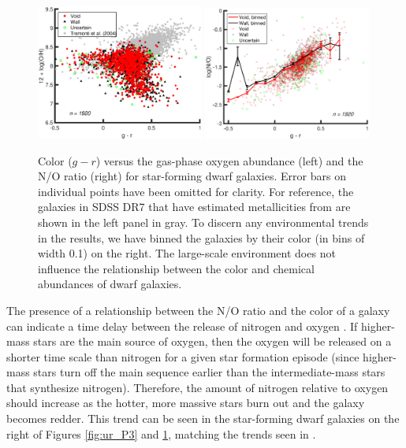 \begin{figure}
    \centering
    \includegraphics[width=0.49\textwidth]{Images/Paper3/gr_OH_1sig_I06relations_dwarf+T04_SF_t3_dust}
    \includegraphics[width=0.49\textwidth]{Images/Paper3/gr_NO_1sig_I06relations_dwarf_SF_t3_dust_scatterGRbin}
    \caption[$g-r$ versus O/H and N/O for star-forming dwarf galaxies]{Color 
    ($g-r$) versus the gas-phase oxygen abundance (left) and the N/O ratio 
    (right) for star-forming dwarf galaxies.  Error bars on individual points 
    have been omitted for clarity.  For reference, the galaxies in SDSS DR7 that 
    have estimated metallicities from \cite{Tremonti04} are shown in the left 
    panel in gray.  To discern any environmental trends in the results, we have 
    binned the galaxies by their color (in bins of width 0.1) on the right.  The 
    large-scale environment does not influence the relationship between the 
    color and chemical abundances of dwarf galaxies.}
    \label{fig:gr}
\end{figure}

The presence of a relationship between the N/O ratio and the color of a galaxy 
can indicate a time delay between the release of nitrogen and oxygen 
\citep{vanZee06a,Berg12}.  If higher-mass stars are the main source of oxygen, 
then the oxygen will be released on a shorter time scale than nitrogen for a 
given star formation episode (since higher-mass stars turn off the main sequence 
earlier than the intermediate-mass stars that synthesize nitrogen).  Therefore, 
the amount of nitrogen relative to oxygen should increase as the hotter, more 
massive stars burn out and the galaxy becomes redder.  This trend can be seen in 
the star-forming dwarf galaxies on the right of Figures \ref{fig:ur_P3} and 
\ref{fig:gr}, matching the trends seen in \cite{Douglass17b,vanZee06a,Berg12}.

